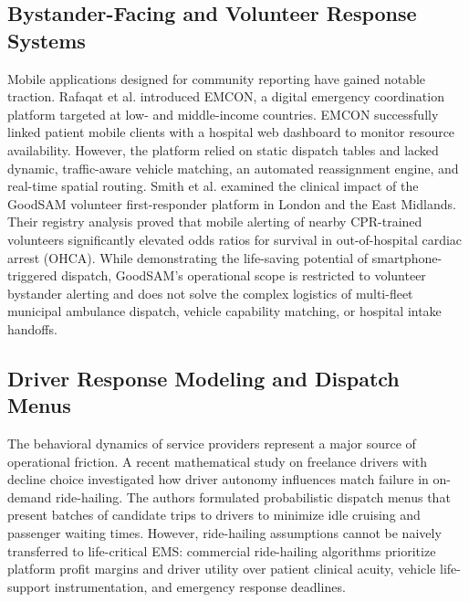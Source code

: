 \documentclass[conference]{IEEEtran}
\begin{document}
\subsection{Bystander-Facing and Volunteer Response Systems}
Mobile applications designed for community reporting have gained notable traction. Rafaqat et al. \cite{emcon} introduced EMCON, a digital emergency coordination platform targeted at low- and middle-income countries. EMCON successfully linked patient mobile clients with a hospital web dashboard to monitor resource availability. However, the platform relied on static dispatch tables and lacked dynamic, traffic-aware vehicle matching, an automated reassignment engine, and real-time spatial routing. Smith et al. \cite{goodsam} examined the clinical impact of the GoodSAM volunteer first-responder platform in London and the East Midlands. Their registry analysis proved that mobile alerting of nearby CPR-trained volunteers significantly elevated odds ratios for survival in out-of-hospital cardiac arrest (OHCA). While demonstrating the life-saving potential of smartphone-triggered dispatch, GoodSAM's operational scope is restricted to volunteer bystander alerting and does not solve the complex logistics of multi-fleet municipal ambulance dispatch, vehicle capability matching, or hospital intake handoffs.

\subsection{Driver Response Modeling and Dispatch Menus}
The behavioral dynamics of service providers represent a major source of operational friction. A recent mathematical study on freelance drivers with decline choice \cite{zhou2024freelance} investigated how driver autonomy influences match failure in on-demand ride-hailing. The authors formulated probabilistic dispatch menus that present batches of candidate trips to drivers to minimize idle cruising and passenger waiting times. However, ride-hailing assumptions cannot be naively transferred to life-critical EMS: commercial ride-hailing algorithms prioritize platform profit margins and driver utility over patient clinical acuity, vehicle life-support instrumentation, and emergency response deadlines.
\end{document}
